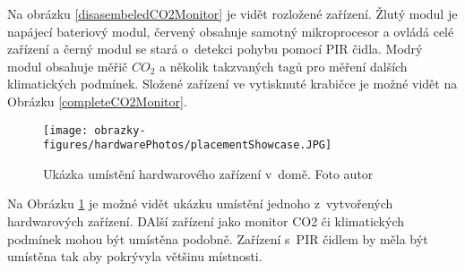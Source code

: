 Na obrázku \ref{disasembeledCO2Monitor} je vidět rozložené zařízení. Žlutý modul je napájecí bateriový modul, červený obsahuje samotný mikroprocesor a ovládá celé zařízení a černý modul se stará o~detekci pohybu pomocí PIR čidla. Modrý modul obsahuje měřič $CO_2$ a několik takzvaných tagů pro měření dalších klimatických podmínek. Složené zařízení ve vytisknuté krabičce je možné vidět na Obrázku \ref{completeCO2Monitor}.

\begin{figure}[H]
  \centering
  \texttt{[image: obrazky-figures/hardwarePhotos/placementShowcase.JPG]}
  \caption{Ukázka umístění hardwarového zařízení v~domě. Foto autor}
  \label{placementShowcase}
\end{figure}

Na Obrázku \ref{placementShowcase} je možné vidět ukázku umístění jednoho z~vytvořených hardwarových zařízení. DAlší zařízení jako monitor CO2 či klimatických podmínek mohou být umístěna podobně. Zařízení s~PIR čidlem by měla být umístěna tak aby pokrývyla většinu místnosti.